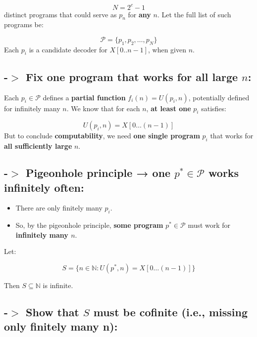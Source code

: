 \documentclass[12pt]{article}
\begin{document}
\[
N = 2^{c} - 1
\]
\newline
distinct programs that could serve as \( p_n \) for \textbf{any} \( n \). Let the full list of such programs be:

\[
\mathcal{P} = \{p_1, p_2, \ldots, p_N\}
\]
\newline
Each \( p_i \) is a candidate decoder for \( X[0..n-1] \), when given \( n \).

\subsection*{-$>$ Fix one program that works for all large \( n \):}


Each \( p_i \in \mathcal{P} \) defines a \textbf{partial function} \( f_i(n) = U(p_i, n) \), potentially defined for infinitely many \( n \).
\newline
We know that for each \( n \), \textbf{at least one} \( p_i \) satisfies:

\[
U(p_i, n) = X[0\ldots(n-1)]
\]
\newline
But to conclude \textbf{computability}, we need \textbf{one single program} \( p_i \) that works for \textbf{all sufficiently large} \( n \).

\subsection*{-$>$ Pigeonhole principle → one \( p^* \in \mathcal{P} \) works infinitely often:}

\begin{itemize}
  \item There are only finitely many \( p_i \).
  \item So, by the pigeonhole principle, \textbf{some program} \( p^* \in \mathcal{P} \) must work for \textbf{infinitely many \( n \)}.
\end{itemize}

Let:

\[
S = \{ n \in \mathbb{N} : U(p^*, n) = X[0\ldots(n-1)] \}
\]

Then \( S \subseteq \mathbb{N} \) is infinite.

\subsection*{-$>$ Show that \( S \) must be cofinite (i.e., missing only finitely many n):}
\end{document}
